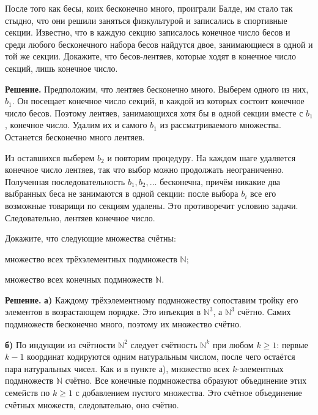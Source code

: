 \begin{problems}
\item После того как бесы, коих бесконечно много, проиграли Балде, им стало так стыдно, что они решили заняться физкультурой и записались в спортивные секции. Известно, что в каждую секцию записалось конечное число бесов и среди любого бесконечного набора бесов найдутся двое, занимающиеся в одной и той же секции. Докажите, что бесов-лентяев, которые ходят в конечное число секций, лишь конечное число.
\par\smallskip\noindent\textbf{Решение.} Предположим, что лентяев бесконечно много. Выберем одного из них, $b_1$. Он посещает конечное число секций, в каждой из которых состоит конечное число бесов. Поэтому лентяев, занимающихся хотя бы в одной секции вместе с $b_1$, конечное число. Удалим их и самого $b_1$ из рассматриваемого множества. Останется бесконечно много лентяев.
\par Из оставшихся выберем $b_2$ и повторим процедуру. На каждом шаге удаляется конечное число лентяев, так что выбор можно продолжать неограниченно. Полученная последовательность $b_1,b_2,\ldots$ бесконечна, причём никакие два выбранных беса не занимаются в одной секции: после выбора $b_i$ все его возможные товарищи по секциям удалены. Это противоречит условию задачи. Следовательно, лентяев конечное число.\par

\item Докажите, что следующие множества счётны:
\begin{parts}
  \item множество всех трёхэлементных подмножеств $\mathbb N$;
  \item множество всех конечных подмножеств $\mathbb N$.
\end{parts}
\par\smallskip\noindent\textbf{Решение.} \textbf{а)} Каждому трёхэлементному подмножеству сопоставим тройку его элементов в возрастающем порядке. Это инъекция в $\mathbb N^3$, а $\mathbb N^3$ счётно. Самих подмножеств бесконечно много, поэтому их множество счётно.
\par\textbf{б)} По индукции из счётности $\mathbb N^2$ следует счётность $\mathbb N^k$ при любом $k\ge1$: первые $k-1$ координат кодируются одним натуральным числом, после чего остаётся пара натуральных чисел. Как и в пункте а), множество всех $k$-элементных подмножеств $\mathbb N$ счётно. Все конечные подмножества образуют объединение этих семейств по $k\ge1$ с добавлением пустого множества. Это счётное объединение счётных множеств, следовательно, оно счётно.\par


\end{problems}
